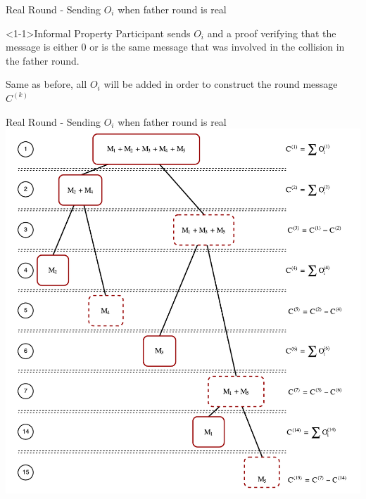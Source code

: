 \begin{frame}{Real Round - Sending $O_i$ when father round is real}
    \begin{block}<1-1>{Informal Property}
        Participant sends $O_i$ and a proof verifying that the message is either 0 or is the same message that was involved in the collision in the father round.
        
        Same as before, all $O_i$ will be added in order to construct the round message $C^{(k)}$
    \end{block}
\end{frame}

\begin{frame}{Real Round - Sending $O_i$ when father round is real}
    \centering
    \includegraphics[scale=.4]{images/collision-resolution-example-00.pdf}
\end{frame}